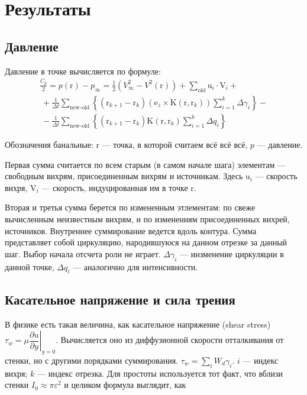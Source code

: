 \documentclass[11pt]{article}
\newcommand{\br}[1]{\boldsymbol{\mathrm{#1}}}
\begin{document}
\section{Результаты}
\subsection{Давление}
Давление в точке вычисляется по формуле:
\begin{multline*}
\frac{C_p}{2} = p(\br r) - p_\infty = \frac{1}{2} \left( V^2_\infty - V^2(\br r) \right) 
+\sum\limits_\text{old}{\br u_i \cdot \br V_i} + \\
\
+\frac{1}{\Delta t}\sum\limits_\text{new-old}
{\left\lbrace\left( \br r_{k+1} - \br r_k \right)\left( \br e_z \times \br K(\br r, \br r_k) \right)
\sum_{i=1}^k{\Delta\gamma_i}\right\rbrace} - \\
\
- \frac{1}{\Delta t}\sum\limits_\text{new-old}
{\left\lbrace\left( \br r_{k+1} - \br r_k \right)
\br K(\br r, \br r_k) \sum_{i=1}^k{\Delta q_i}\right\rbrace}
\end{multline*}

Обозначения банальные: $\br r$ --- точка, в которой считаем всё всё всё,
$p$ --- давление.

Первая сумма считается по всем старым (в самом начале шага) элементам ---
свободным вихрям, присоединенным вихрям и источникам. Здесь
$\br u_i$ --- скорость вихря,
$\br V_i$ --- скорость, индуцированная им в точке $\br r$.

Вторая и третья сумма берется по измененным этлементам: по свеже 
вычисленным неизвестным вихрям, и по изменениям присоединенных вихрей, источников.
Внутреннее суммирование ведется вдоль контура. Сумма представляет собой циркуляцию,
народившуюся на данном отрезке за данный шаг. Выбор начала отсчета роли не играет.
$\Delta \gamma_i$ --- инзменение циркуляции в данной точке,
$\Delta q_i$ --- аналогично для интенсивности.

\subsection{Касательное напряжение и сила трения}

В физике есть такая величина, как касательное напряжение (shear stress) $\tau_w = \mu \left. \dfrac{\partial u}{\partial y} \right|_{y=0}$. Вычисляется оно из диффузионной скорости отталкивания от стенки, но с другими порядками суммирования. $ \tau_w = \sum_i {W_d \gamma_i}$. $i$ --- индекс вихря; $k$ --- индекс отрезка. Для простоты используется тот факт, что вблизи стенки $I_0 \approx \pi\varepsilon^2$ и целиком формула выглядит, как
\end{document}
